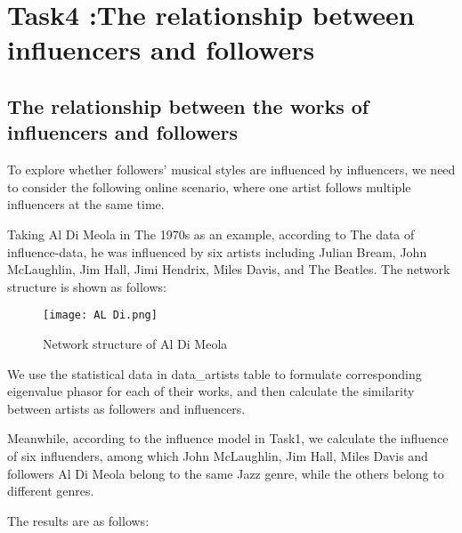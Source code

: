 \documentclass[12pt]{article}  %
\begin{document}
\section{Task4 :The relationship between influencers and followers}

\subsection{The relationship between the works of influencers and followers}

To explore whether followers' musical styles are influenced by influencers, we need to consider the following online scenario, where one artist follows multiple influencers at the same time. 

Taking Al Di Meola in The 1970s as an example, according to The data of influence-data, he was influenced by six artists including Julian Bream, John McLaughlin, Jim Hall, Jimi Hendrix, Miles Davis, and The Beatles. The network structure is shown as follows:

\begin{figure}[H]
    \centering
    \texttt{[image: AL Di.png]}
    \caption{Network structure of Al Di Meola}
    \label{img}
\end{figure}

We use the statistical data in data\_artists table to formulate corresponding eigenvalue phasor for each of their works, and then calculate the similarity between artists as followers and influencers.

Meanwhile, according to the influence model in Task1, we calculate the influence of six influenders, among which John McLaughlin, Jim Hall, Miles Davis and followers Al Di Meola belong to the same Jazz genre, while the others belong to different genres.

The results are as follows:
\end{document}
